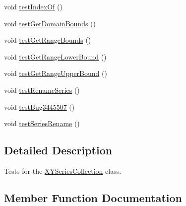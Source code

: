 \begin{DoxyCompactItemize}
\item 
void \mbox{\hyperlink{classorg_1_1jfree_1_1data_1_1xy_1_1_x_y_series_collection_test_a16324db0f9aa58397fe5a5fb2a990deb}{test\+Index\+Of}} ()
\item 
void \mbox{\hyperlink{classorg_1_1jfree_1_1data_1_1xy_1_1_x_y_series_collection_test_a8ee9f45afe177d3d0e712638d3a6cc07}{test\+Get\+Domain\+Bounds}} ()
\item 
void \mbox{\hyperlink{classorg_1_1jfree_1_1data_1_1xy_1_1_x_y_series_collection_test_a5a8be553a1e463a800c31b65ecf5862f}{test\+Get\+Range\+Bounds}} ()
\item 
void \mbox{\hyperlink{classorg_1_1jfree_1_1data_1_1xy_1_1_x_y_series_collection_test_a2c15c054e5725e466fe662a3814451e9}{test\+Get\+Range\+Lower\+Bound}} ()
\item 
void \mbox{\hyperlink{classorg_1_1jfree_1_1data_1_1xy_1_1_x_y_series_collection_test_ac70e29a346b7ae58365fcff0b59744d5}{test\+Get\+Range\+Upper\+Bound}} ()
\item 
void \mbox{\hyperlink{classorg_1_1jfree_1_1data_1_1xy_1_1_x_y_series_collection_test_ab091fd068423abdce98353211aeebeab}{test\+Rename\+Series}} ()
\item 
void \mbox{\hyperlink{classorg_1_1jfree_1_1data_1_1xy_1_1_x_y_series_collection_test_a3a660dd0f738469b45dcc8bb984a2fc3}{test\+Bug3445507}} ()
\item 
void \mbox{\hyperlink{classorg_1_1jfree_1_1data_1_1xy_1_1_x_y_series_collection_test_aecabbebc21d2878aaca603f127fe5f6b}{test\+Series\+Rename}} ()
\end{DoxyCompactItemize}


\subsection{Detailed Description}
Tests for the \mbox{\hyperlink{classorg_1_1jfree_1_1data_1_1xy_1_1_x_y_series_collection}{X\+Y\+Series\+Collection}} class. 

\subsection{Member Function Documentation}
\mbox{\label{classorg_1_1jfree_1_1data_1_1xy_1_1_x_y_series_collection_test_a6ee0af50b0229c764ca9c54343126d56}} 
